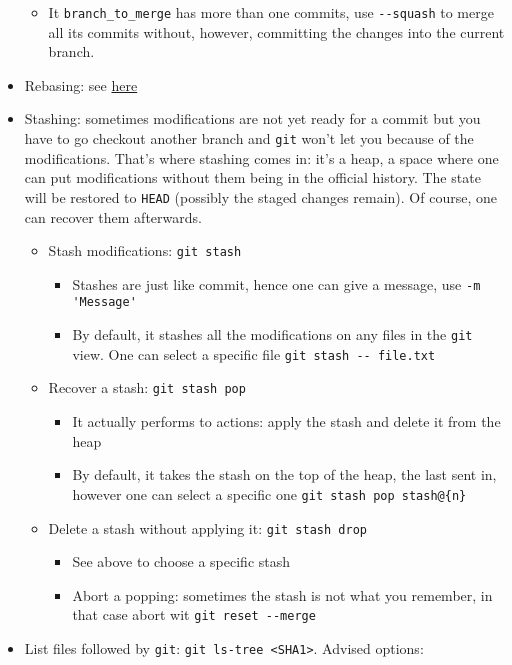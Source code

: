 \documentclass[a4paper,12pt,%
              final%
              ]{article}
\begin{document}
\begin{itemize}
\begin{itemize}
      \item It \verb|branch_to_merge| has more than one commits, use \verb|--squash| to merge all its commits without, however, committing the changes into the current branch.
    \end{itemize}
  \item Rebasing: see \href{https://git-scm.com/book/en/v2/Git-Branching-Rebasing}{here}
  \item Stashing: sometimes modifications are not yet ready for a commit but you have to go checkout another branch and \texttt{git} won't let you because of the modifications. That's where stashing comes in: it's a heap, a space where one can put modifications without them being in the official history. The state will be restored to \texttt{HEAD} (possibly the staged changes remain). Of course, one can recover them afterwards.
    \begin{itemize}
      \item Stash modifications: \texttt{git stash}
        \begin{itemize}
          \item Stashes are just like commit, hence one can give a message, use \verb|-m 'Message'|
          \item By default, it stashes all the modifications on any files in the \texttt{git} view. One can select a specific file \verb|git stash -- file.txt|
        \end{itemize}
      \item Recover a stash: \texttt{git stash pop}
        \begin{itemize}
          \item It actually performs to actions: apply the stash and delete it from the heap
          \item By default, it takes the stash on the top of the heap, the last sent in, however one can select a specific one \verb|git stash pop stash@{n}|
        \end{itemize}
      \item Delete a stash without applying it: \texttt{git stash drop}
        \begin{itemize}
          \item See above to choose a specific stash
          \item Abort a popping: sometimes the stash is not what you remember, in that case abort wit \verb|git reset --merge|
        \end{itemize}
    \end{itemize}
  \item List files followed by \texttt{git}: \verb|git ls-tree <SHA1>|. Advised options:

\end{itemize}
\end{document}
